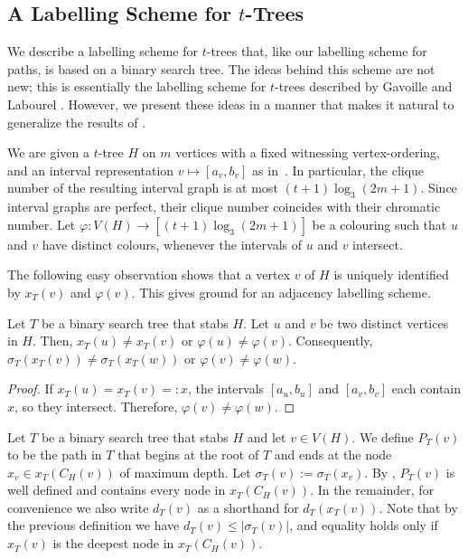 \documentclass[kpfonts]{patmorin}
\let\le\leqslant
\begin{document}
\subsection{A Labelling Scheme for $t$-Trees}

We describe a labelling scheme for $t$-trees that, like our labelling scheme for paths, is based on a binary search tree.  The ideas behind this scheme are not new; this is essentially the labelling scheme for $t$-trees described by Gavoille and Labourel \cite{gavoille.labourel:shorter}.  However, we present these ideas in a manner that makes it natural to generalize the results of .


We are given a $t$-tree $H$ on $m$ vertices with a fixed witnessing vertex-ordering,
and an interval representation $v\mapsto[a_v,b_v]$ as in~. 
In particular, the clique number of the resulting interval graph is at most $(t+1)\log_3 (2m+1)$.
Since interval graphs are perfect, their clique number coincides with their chromatic number.
Let $\varphi: V(H) \to [(t+1)\log_3 (2m+1)]$ be a colouring such that $u$ and $v$ have distinct colours, whenever the intervals of $u$ and $v$ intersect. 

The following easy observation shows that a vertex $v$ of $H$ is uniquely identified by 
$x_T(v)$ and $\varphi(v)$. This gives ground for an adjacency labelling scheme.

\begin{obs}
    Let $T$ be a binary search tree that stabs $H$.
    Let $u$ and $v$ be two distinct vertices in $H$. 
    Then, $x_T(u)\neq x_T(v)$ or $\varphi(u)\neq\varphi(v)$. 
    Consequently, $\sigma_T(x_T(v))\neq \sigma_T(x_T(w))$ or $\varphi(v)\neq\varphi(w)$.
\end{obs}

\begin{proof}
  If $x_T(u)=x_T(v)=:x$, the intervals $[a_u,b_u]$ and $[a_v,b_v]$ each contain $x$, 
  so they intersect. 
  Therefore, $\varphi(v)\neq\varphi(w)$.%
\end{proof}

Let $T$ be a binary search tree that stabs $H$ and let $v\in V(H)$.
We define $P_T(v)$ to be the path in $T$ that begins at the root of $T$ and ends at the node  $x_v \in x_T(C_H(v))$ of maximum depth. Let $\sigma_T(v):=\sigma_T(x_v)$.
By , $P_T(v)$ is well defined and contains every node in $x_T(C_H(v))$. In the remainder, for convenience we also write $d_T(v)$ as a shorthand for $d_T(x_T(v))$. Note that by the previous definition we have $ d_T(v)\le |\sigma_T(v)|$, and equality holds only if $x_T(v)$ is the deepest node in $x_T(C_H(v))$.
\end{document}
